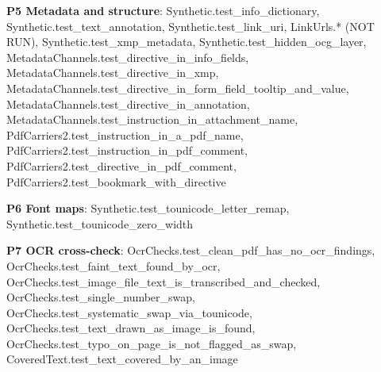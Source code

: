 \documentclass[10pt,a4paper]{article}
\begin{document}
\textbf{P5 Metadata and structure}: \textcolor{ok}{Synthetic.\allowbreak{}test\_\allowbreak{}info\_\allowbreak{}dictionary}, \textcolor{ok}{Synthetic.\allowbreak{}test\_\allowbreak{}text\_\allowbreak{}annotation}, \textcolor{ok}{Synthetic.\allowbreak{}test\_\allowbreak{}link\_\allowbreak{}uri}, \textcolor{bad}{LinkUrls.\allowbreak{}*  (NOT RUN)}, \textcolor{ok}{Synthetic.\allowbreak{}test\_\allowbreak{}xmp\_\allowbreak{}metadata}, \textcolor{ok}{Synthetic.\allowbreak{}test\_\allowbreak{}hidden\_\allowbreak{}ocg\_\allowbreak{}layer}, \textcolor{ok}{MetadataChannels.\allowbreak{}test\_\allowbreak{}directive\_\allowbreak{}in\_\allowbreak{}info\_\allowbreak{}fields}, \textcolor{ok}{MetadataChannels.\allowbreak{}test\_\allowbreak{}directive\_\allowbreak{}in\_\allowbreak{}xmp}, \textcolor{ok}{MetadataChannels.\allowbreak{}test\_\allowbreak{}directive\_\allowbreak{}in\_\allowbreak{}form\_\allowbreak{}field\_\allowbreak{}tooltip\_\allowbreak{}and\_\allowbreak{}value}, \textcolor{ok}{MetadataChannels.\allowbreak{}test\_\allowbreak{}directive\_\allowbreak{}in\_\allowbreak{}annotation}, \textcolor{ok}{MetadataChannels.\allowbreak{}test\_\allowbreak{}instruction\_\allowbreak{}in\_\allowbreak{}attachment\_\allowbreak{}name}, \textcolor{ok}{PdfCarriers2.\allowbreak{}test\_\allowbreak{}instruction\_\allowbreak{}in\_\allowbreak{}a\_\allowbreak{}pdf\_\allowbreak{}name}, \textcolor{ok}{PdfCarriers2.\allowbreak{}test\_\allowbreak{}instruction\_\allowbreak{}in\_\allowbreak{}pdf\_\allowbreak{}comment}, \textcolor{ok}{PdfCarriers2.\allowbreak{}test\_\allowbreak{}directive\_\allowbreak{}in\_\allowbreak{}pdf\_\allowbreak{}comment}, \textcolor{ok}{PdfCarriers2.\allowbreak{}test\_\allowbreak{}bookmark\_\allowbreak{}with\_\allowbreak{}directive}\par
\textbf{P6 Font maps}: \textcolor{ok}{Synthetic.\allowbreak{}test\_\allowbreak{}tounicode\_\allowbreak{}letter\_\allowbreak{}remap}, \textcolor{ok}{Synthetic.\allowbreak{}test\_\allowbreak{}tounicode\_\allowbreak{}zero\_\allowbreak{}width}\par
\textbf{P7 OCR cross-check}: \textcolor{ok}{OcrChecks.\allowbreak{}test\_\allowbreak{}clean\_\allowbreak{}pdf\_\allowbreak{}has\_\allowbreak{}no\_\allowbreak{}ocr\_\allowbreak{}findings}, \textcolor{ok}{OcrChecks.\allowbreak{}test\_\allowbreak{}faint\_\allowbreak{}text\_\allowbreak{}found\_\allowbreak{}by\_\allowbreak{}ocr}, \textcolor{ok}{OcrChecks.\allowbreak{}test\_\allowbreak{}image\_\allowbreak{}file\_\allowbreak{}text\_\allowbreak{}is\_\allowbreak{}transcribed\_\allowbreak{}and\_\allowbreak{}checked}, \textcolor{ok}{OcrChecks.\allowbreak{}test\_\allowbreak{}single\_\allowbreak{}number\_\allowbreak{}swap}, \textcolor{ok}{OcrChecks.\allowbreak{}test\_\allowbreak{}systematic\_\allowbreak{}swap\_\allowbreak{}via\_\allowbreak{}tounicode}, \textcolor{ok}{OcrChecks.\allowbreak{}test\_\allowbreak{}text\_\allowbreak{}drawn\_\allowbreak{}as\_\allowbreak{}image\_\allowbreak{}is\_\allowbreak{}found}, \textcolor{ok}{OcrChecks.\allowbreak{}test\_\allowbreak{}typo\_\allowbreak{}on\_\allowbreak{}page\_\allowbreak{}is\_\allowbreak{}not\_\allowbreak{}flagged\_\allowbreak{}as\_\allowbreak{}swap}, \textcolor{ok}{CoveredText.\allowbreak{}test\_\allowbreak{}text\_\allowbreak{}covered\_\allowbreak{}by\_\allowbreak{}an\_\allowbreak{}image}\par
\end{document}
